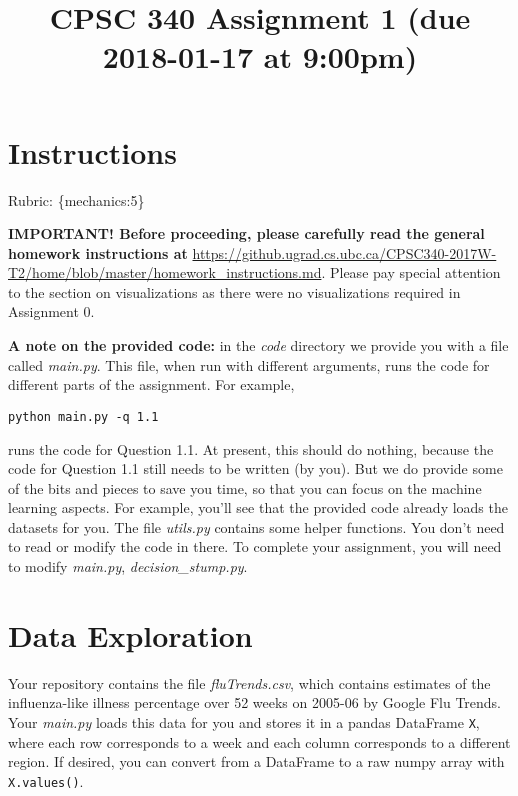 \documentclass{article}
\def\rubric#1{\gre{Rubric: \{#1\}}}{}
\def\gre#1{{\color{gre}#1}}
\begin{document}
\title{CPSC 340 Assignment 1 (due 2018-01-17 at 9:00pm)}

\date{}
\maketitle

\vspace{-6em}

\begin{comment}
\url{http://unstats.un.org/unsd/demographic/products/indwm/default.htm}
\end{comment}

\section*{Instructions}
\rubric{mechanics:5}

\textbf{IMPORTANT! Before proceeding, please carefully read the general homework instructions at} \url{https://github.ugrad.cs.ubc.ca/CPSC340-2017W-T2/home/blob/master/homework_instructions.md}.
Please pay special attention to the section on visualizations as there were
no visualizations required in Assignment 0.

\textbf{A note on the provided code:} in the \emph{code} directory we provide you with a file called
\emph{main.py}. This file, when run with different arguments, runs the code for different
parts of the assignment. For example,
\begin{verbatim}
python main.py -q 1.1
\end{verbatim}
runs the code for Question 1.1. At present, this should do nothing, because the code
for Question 1.1 still needs to be written (by you). But we do provide some of the bits
and pieces to save you time, so that you can focus on the machine learning aspects.
For example, you'll see that the provided code already loads the datasets for you.
The file \emph{utils.py} contains some helper functions.
You don't need to read or modify the code in there.
To complete your assignment, you will need to modify \emph{main.py}, \emph{decision\_stump.py}.

\section{Data Exploration}


Your repository contains the file \emph{fluTrends.csv}, which contains estimates
of the influenza-like illness percentage over 52 weeks on 2005-06 by Google Flu Trends.
Your \emph{main.py} loads this data for you and stores it in a pandas DataFrame \texttt{X},
where each row corresponds to a week and each column
corresponds to a different
region. If desired, you can convert from a DataFrame to a raw numpy array with \texttt{X.values()}.
\end{document}
